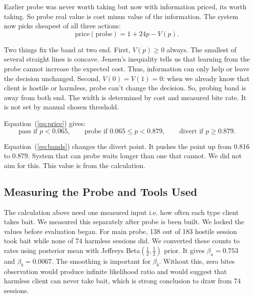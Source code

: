 \documentclass[runningheads]{llncs}
\begin{document}
Earlier probe was never worth taking but now with information priced, its worth taking. So probe real value is cost minus value of the information. The system now picks cheapest of all three actions:
%
\begin{equation}
\text{price}(\text{probe}) = 1 + 24p - V(p).
\label{eq:price}
\end{equation}

Two things fix the band at two end. First, $V(p) \ge 0$ always. The smallest of several straight lines is concave. Jensen's inequality tells us that learning from the probe cannot increase the expected cost. Thus, information can only help or leave the decision unchanged. Second, $V(0) = V(1) = 0$: when we already know that client is hostile or harmless, probe can't change the decision. So, probing band is away from both end. The width is determined by cost and measured bite rate. It is not set by manual chosen threshold.

Equation~(\ref{eq:price}) gives:
%
\begin{equation}
\text{pass if } p < 0.065, \qquad
\text{probe if } 0.065 \le p < 0.879, \qquad
\text{divert if } p \ge 0.879 .
\label{eq:bands}
\end{equation}

Equation~(\ref{eq:bands}) changes the divert point. It pushes the point up from 0.816 to 0.879. System that can probe waits longer than one that cannot. We did not aim for this. This value is from the calculation. 

\subsection{Measuring the Probe and Tools Used}
\label{sec:tools}

The calculation above need one measured input i.e. how often each type client takes bait. We measured this separately after probe is been built. We locked the values before evaluation began. For main probe, 138 out of 183 hostile session took bait while none of 74 harmless sessions did. We converted these counts to rates using  posterior mean with Jeffreys Beta$(\tfrac12,\tfrac12)$ prior. It gives $\beta_a = 0.753$ and $\beta_b = 0.0067$. The smoothing is important for $\beta_b$. Without this, zero bites observation would produce infinite likelihood ratio and would suggest that harmless client can never take bait, which is strong conclusion to draw from 74 sessions.
\end{document}
